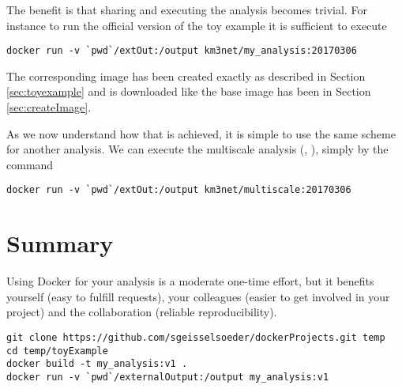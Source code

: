 \documentclass[a4paper, twoside, 11pt]{article}
\begin{document}
The benefit is that sharing and executing the analysis becomes trivial. 
For instance to run the official version of the toy example it is sufficient to execute
\begin{lstlisting}[basicstyle=\footnotesize\ttfamily,frame=single]
docker run -v `pwd`/extOut:/output km3net/my_analysis:20170306
\end{lstlisting}
The corresponding image has been created exactly as described in Section \ref{sec:toyexample} 
and is downloaded like the base image has been in Section \ref{sec:createImage}. 

As we now understand how that is achieved, 
it is simple to use the same scheme for another analysis. 
We can execute the multiscale analysis (\cite{geisselsoeder:phd}, \cite{gith:multiscale}), 
simply by the command 
\begin{lstlisting}[basicstyle=\footnotesize\ttfamily,frame=single]
docker run -v `pwd`/extOut:/output km3net/multiscale:20170306
\end{lstlisting}


\section{Summary}

Using Docker for your analysis is a moderate one-time effort, 
but it benefits yourself (easy to fulfill requests), 
your colleagues (easier to get involved in your project) 
and the collaboration (reliable reproducibility).

\begin{lstlisting}[basicstyle=\footnotesize\ttfamily,frame=single]
git clone https://github.com/sgeisselsoeder/dockerProjects.git temp
cd temp/toyExample
docker build -t my_analysis:v1 .
docker run -v `pwd`/externalOutput:/output my_analysis:v1
\end{lstlisting}




\end{document}
